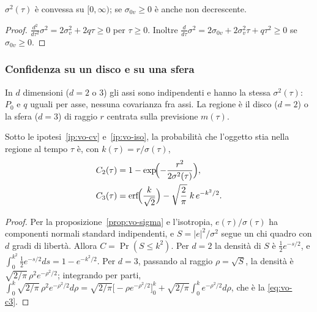 \begin{lemma}[Convessità]\label{lem:vo-convessa}
$\sigma^2(\tau)$ è convessa su $[0,\infty)$; se $\sigma_{0v}\ge0$ è anche non decrescente.
\end{lemma}
\begin{proof}
$\tfrac{d^2}{d\tau^2}\sigma^2=2\sigma_v^2+2q\tau\ge0$ per $\tau\ge0$. Inoltre $\tfrac{d}{d\tau}\sigma^2=2\sigma_{0v}+2\sigma_v^2\tau+q\tau^2\ge0$ se $\sigma_{0v}\ge0$.
\end{proof}

\subsubsection{Confidenza su un disco e su una sfera}\label{sec:vo-c-chiusa}

\begin{ipotesi}[Isotropia]\label{ip:vo-iso}
In $d$ dimensioni ($d=2$ o $3$) gli assi sono indipendenti e hanno la stessa $\sigma^2(\tau)$: $P_0$ e $q$ uguali per asse, nessuna covarianza fra assi. La regione è il disco ($d=2$) o la sfera ($d=3$) di raggio $r$ centrata sulla previsione $m(\tau)$.
\end{ipotesi}

\begin{proposizione}\label{prop:vo-c}
Sotto le ipotesi~\ref{ip:vo-cv} e~\ref{ip:vo-iso}, la probabilità che l'oggetto stia nella regione al tempo $\tau$ è, con $k(\tau)=r/\sigma(\tau)$,
\begin{align}
C_2(\tau)&=1-\exp\!\Bigl(-\frac{r^2}{2\sigma^2(\tau)}\Bigr),\label{eq:vo-c2}\\
C_3(\tau)&=\operatorname{erf}\!\Bigl(\frac{k}{\sqrt2}\Bigr)-\sqrt{\frac{2}{\pi}}\;k\,e^{-k^2/2}.\label{eq:vo-c3}
\end{align}
\end{proposizione}
\begin{proof}
Per la proposizione~\ref{prop:vo-sigma} e l'isotropia, $e(\tau)/\sigma(\tau)$ ha componenti normali standard indipendenti, e $S=|e|^2/\sigma^2$ segue un chi quadro con $d$ gradi di libertà. Allora $C=\Pr(S\le k^2)$. Per $d=2$ la densità di $S$ è $\tfrac12e^{-s/2}$, e $\int_0^{k^2}\tfrac12e^{-s/2}ds=1-e^{-k^2/2}$. Per $d=3$, passando al raggio $\rho=\sqrt S$, la densità è $\sqrt{2/\pi}\,\rho^2e^{-\rho^2/2}$; integrando per parti,
$\int_0^k\sqrt{2/\pi}\,\rho^2e^{-\rho^2/2}d\rho=\sqrt{2/\pi}\bigl[-\rho e^{-\rho^2/2}\bigr]_0^k+\sqrt{2/\pi}\int_0^ke^{-\rho^2/2}d\rho$, che è la \eqref{eq:vo-c3}.
\end{proof}

